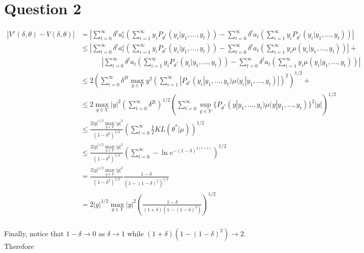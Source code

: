 \documentclass{article}
\begin{document}

\section{Question 2}
\label{sec:Question 2}

\newcommand{\sumt}{\sum_{t=0}^\infty}
\newcommand{\sumi}{\sum_{i=1}^\infty}
\newcommand{\Pth}{P_{\theta^*}(y_i|y_1, \ldots, y_t)}
\newcommand{\muth}{\mu(y_i|y_1, \ldots, y_t)}
\[
  \begin{split}
  |V^c(\delta, \theta) - V(\delta, \theta)| & = \left|
      \sumt \delta^t a^c_t \left(\sumi y_i \Pth\right) - 
          \sumt \delta^t a_t \left(\sumi y_i \Pth\right)
          \right| \\
    & \le \left|
        \sumt \delta^t a^c_t \left(\sumi y_i \Pth\right) - 
            \sumt \delta^t a_t \left(\sumi y_i \muth\right)
            \right| + \\ 
      & \qquad\quad \left|
        \sumt \delta^t a_t \left(\sumi y_i \Pth\right) - 
            \sumt \delta^t a_t \left(\sumi y_i \muth\right)
            \right| \\
    & \le 2\left(
        \sumt \delta^{2t} \max_{y \in Y} y^2
            \left(\sumi |\Pth \muth|\right)^2\right)^{1/2} + \\
    & \le 2\max_{y \in Y} |y|^2 \left(\sumt \delta^{2t}\right)^{1/2} 
        \left(\sumt \sup_{y \in Y}\{
            P_{\theta^*}(y|y_1, \ldots, y_t)
            \mu(y|y_1, \ldots, y_t)\}^2 |y|\right)^{1/2} \\
    & \le \frac{2|y|^{1/2}\max_{y \in Y} |y|^2}{(1 - \delta^2)^{1/2}} 
          \left(\sumt \frac{1}{2}KL(\theta^*|\mu)\right)^{1/2} \\
    & \le \frac{2|y|^{1/2}\max_{y \in Y} |y|^2}{(1 - \delta^2)^{1/2}} 
          \left(\sumt -\ln e^{-(1 -\delta)^{2(t+1)}}\right)^{1/2} \\
    & = \frac{2|y|^{1/2}\max_{y \in Y} |y|^2}{(1 - \delta^2)^{1/2}} 
          \frac{1 -\delta}{(1 - (1 - \delta)^2)^{1/2}} \\
    & = 2|y|^{1/2}\max_{y \in Y} |y|^2
          \left(\frac{1 -\delta}{(1 + \delta)(1 - (1 - \delta)^2)}\right)^{1/2} \\
  \end{split}
\]

Finally, notice that $1 - \delta \to 0$ as $\delta \to 1$ while
$(1 + \delta)(1 - (1 - \delta)^2) \to 2$. Therefore
\end{document}
